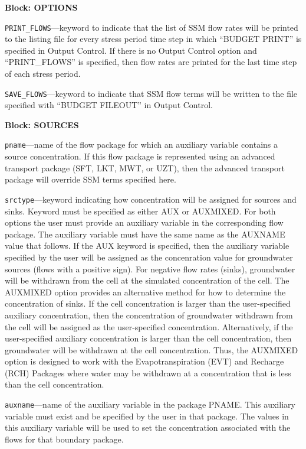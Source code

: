 
\item \textbf{Block: OPTIONS}

\begin{description}
\item \texttt{PRINT\_FLOWS}---keyword to indicate that the list of SSM flow rates will be printed to the listing file for every stress period time step in which ``BUDGET PRINT'' is specified in Output Control.  If there is no Output Control option and ``PRINT\_FLOWS'' is specified, then flow rates are printed for the last time step of each stress period.

\item \texttt{SAVE\_FLOWS}---keyword to indicate that SSM flow terms will be written to the file specified with ``BUDGET FILEOUT'' in Output Control.

\end{description}
\item \textbf{Block: SOURCES}

\begin{description}
\item \texttt{pname}---name of the flow package for which an auxiliary variable contains a source concentration.  If this flow package is represented using an advanced transport package (SFT, LKT, MWT, or UZT), then the advanced transport package will override SSM terms specified here.

\item \texttt{srctype}---keyword indicating how concentration will be assigned for sources and sinks.  Keyword must be specified as either AUX or AUXMIXED.  For both options the user must provide an auxiliary variable in the corresponding flow package.  The auxiliary variable must have the same name as the AUXNAME value that follows.  If the AUX keyword is specified, then the auxiliary variable specified by the user will be assigned as the concenration value for groundwater sources (flows with a positive sign).  For negative flow rates (sinks), groundwater will be withdrawn from the cell at the simulated concentration of the cell.  The AUXMIXED option provides an alternative method for how to determine the concentration of sinks.  If the cell concentration is larger than the user-specified auxiliary concentration, then the concentration of groundwater withdrawn from the cell will be assigned as the user-specified concentration.  Alternatively, if the user-specified auxiliary concentration is larger than the cell concentration, then groundwater will be withdrawn at the cell concentration.  Thus, the AUXMIXED option is designed to work with the Evapotranspiration (EVT) and Recharge (RCH) Packages where water may be withdrawn at a concentration that is less than the cell concentration.

\item \texttt{auxname}---name of the auxiliary variable in the package PNAME.  This auxiliary variable must exist and be specified by the user in that package.  The values in this auxiliary variable will be used to set the concentration associated with the flows for that boundary package.

\end{description}

